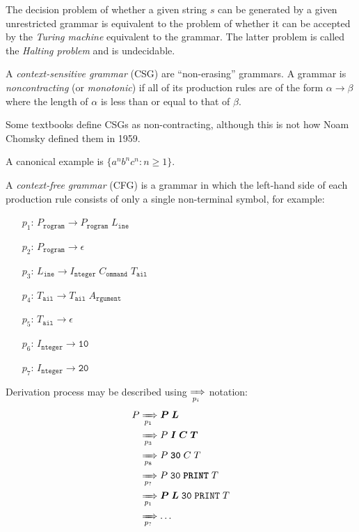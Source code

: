\documentclass{article}
\begin{document}
The decision problem of whether a given string $s$ can be generated by a given unrestricted grammar is equivalent to the problem of whether it can be accepted by the \emph{Turing machine} equivalent to the grammar. The latter problem is called the \emph{Halting problem} and is undecidable.
\plush{}


A \emph{context-sensitive grammar} (CSG) are ``non-erasing'' grammars. A grammar is \emph{noncontracting} (or \emph{monotonic}) if all of its production rules are of the form \(\alpha \to \beta\) where the length of \(\alpha\) is less than or equal to that of \(\beta\).

Some textbooks define CSGs as non-contracting, although this is not how Noam Chomsky defined them in 1959.

A canonical example is \(\{ a^nb^nc^n : n \geq 1 \}\).
\plush{}


A \emph{context-free grammar} (CFG) is a grammar in which the left-hand side of each production rule consists of only a single non-terminal symbol, for example:
\begin{enumerate}
\setlength\itemsep{0pt}
    \item[$p_1$:] $P_\texttt{rogram} \to P_\texttt{rogram} \; L_\texttt{ine}$
    \item[$p_2$:] $P_\texttt{rogram} \to \epsilon$
    \item[$p_3$:] $L_\texttt{ine} \to I_\texttt{nteger} \; C_\texttt{ommand} \; T_\texttt{ail}$
    \item[$p_4$:] $T_\texttt{ail} \to T_\texttt{ail} \; A_\texttt{rgument}$
    \item[$p_5$:] $T_\texttt{ail} \to \epsilon$
    \item[$p_6$:] $I_\texttt{nteger} \to \texttt{10}$
    \item[$p_7$:] $I_\texttt{nteger} \to \texttt{20}$
\end{enumerate}
\plush{}

Derivation process may be described using $\xRightarrow[p_i]{}$ notation:
\begin{equation*}
\begin{split}
P &\xRightarrow[p_1]{} \bm{P} \; \bm{L} \\
  &\xRightarrow[p_3]{} P \; \bm{I} \; \bm{C} \; \bm{T} \\
  &\xRightarrow[p_8]{} P \; \textbf{\texttt{30}} \; C \; T \\
  &\xRightarrow[p_?]{} P \; \texttt{30} \; \textbf{\texttt{PRINT}} \; T \\
  &\xRightarrow[p_1]{} \bm{P} \; \bm{L} \; \texttt{30} \; \texttt{PRINT} \; T \\
  &\xRightarrow[p_?]{} \dots \\
\end{split}
\end{equation*}
\plush{}
\end{document}
